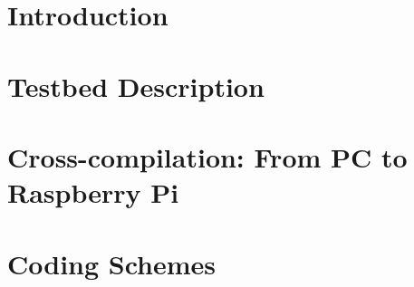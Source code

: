 \documentclass[electronics,article,submit,moreauthors,pdftex,10pt,a4paper]{mdpi}
\theoremstyle{mdpi}
\newcounter{ex}
\newcounter{re}
\theoremstyle{mdpidefinition}
\begin{document}
\newcommand*\Reactivatenumber{%
  \lst@AddToHook{OnNewLine}{%
   \let\thelstnumber\origthelstnumber%
   \advance\c@lstnumber\@ne\relax}%
}






\section{Introduction}


\section{Testbed Description}


\section{Cross-compilation: From PC to Raspberry Pi}


\section{Coding Schemes}


% 
\end{document}
